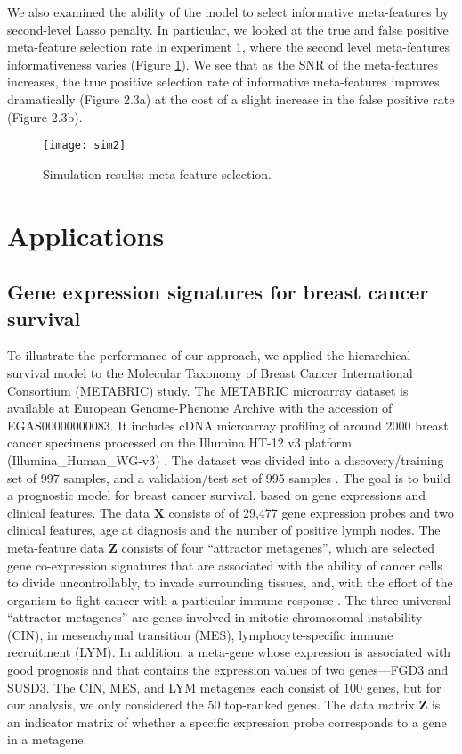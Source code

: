 We also examined the ability of the model to select informative meta-features by second-level Lasso penalty. In particular, we looked at the true and false positive meta-feature selection rate in experiment 1, where the second level meta-features informativeness varies (Figure \ref{fig:sim2}). We see that as the SNR of the meta-features increases, the true positive selection rate of informative meta-features improves dramatically (Figure 2.3a) at the cost of a slight increase in the false positive rate (Figure 2.3b).  
\begin{figure}[tbh]
  \centering
  \texttt{[image: sim2]}
  \caption[Simulation results (`xrnet'): meta-feature selection]{
    Simulation results: meta-feature selection.
  }
  \label{fig:sim2}
\end{figure}

\section{Applications} \label{app:meta2}
\subsection{Gene expression signatures for breast cancer survival}
To illustrate the performance of our approach, we applied the hierarchical survival model to the Molecular Taxonomy of Breast Cancer International Consortium (METABRIC) study. The METABRIC microarray dataset is available at European Genome-Phenome Archive with the accession of EGAS00000000083. It includes cDNA microarray profiling of around 2000 breast cancer specimens processed on the Illumina HT-12 v3 platform (Illumina\_Human\_WG-v3) \citep{curtis2012genomic}. The dataset was divided into a discovery/training set of 997 samples, and a validation/test set of 995 samples \citep{cheng2013development}. The goal is to build a prognostic model for breast cancer survival, based on gene expressions and clinical features. The data $\bm{X}$ consists of of 29,477 gene expression probes and two clinical features, age at diagnosis and the number of positive lymph nodes. The meta-feature data $\bm{Z}$ consists of four ``attractor metagenes'', which are selected gene co-expression signatures that are associated with the ability of cancer cells to divide uncontrollably, to invade surrounding tissues, and, with the effort of the organism to fight cancer with a particular immune response \citep{cheng2013biomolecular}. The three universal “attractor metagenes” are genes involved in mitotic chromosomal instability (CIN), in mesenchymal transition (MES), lymphocyte-specific immune recruitment (LYM). In addition, a meta-gene whose expression is associated with good prognosis and that contains the expression values of two genes—FGD3 and SUSD3. The CIN, MES, and LYM metagenes each consist of 100 genes, but for our analysis, we only considered the 50 top-ranked genes. The data matrix $\bm{Z}$ is an indicator matrix of whether a specific expression probe corresponds to a gene in a metagene. 

